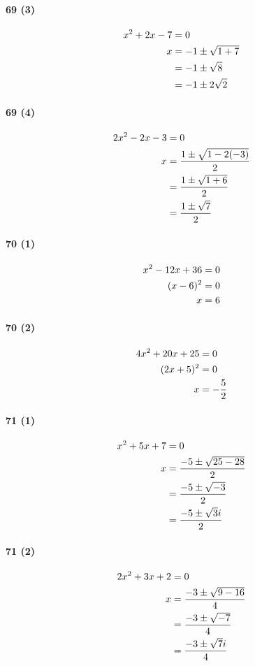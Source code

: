 \documentclass[fleqn,a4j,dvipdfmx,uplatex,twocolumn]{jsarticle}
\def\nr{\notag\\}%
\begin{document}
\paragraph{69 (3)}
\begin{align*}
  x^2 + 2x - 7 &= 0 \nr
  x &= -1 \pm \sqrt{1 + 7} \nr
  &= -1 \pm \sqrt{8} \nr
  &= -1 \pm 2\sqrt{2}
\end{align*}

\paragraph{69 (4)}
\begin{align*}
  2x^2 - 2x - 3 &= 0 \nr
  x &= \frac{1 \pm \sqrt{1 - 2(-3)}}{2} \nr
  &= \frac{1 \pm \sqrt{1 + 6}}{2} \nr
  &= \frac{1 \pm \sqrt{7}}{2}
\end{align*}

\paragraph{70 (1)}
\begin{align*}
  x^2 - 12x + 36 &= 0 \nr
  (x - 6)^2 &= 0 \nr
  x &= 6
\end{align*}

\paragraph{70 (2)}
\begin{align*}
  4x^2 + 20x + 25 &= 0 \nr
  (2x + 5)^2 &= 0 \nr
  x &= -\frac{5}{2}
\end{align*}

\paragraph{71 (1)}
\begin{align*}
  x^2 + 5x + 7 &= 0 \nr
  x &= \frac{-5 \pm \sqrt{25 - 28}}{2} \nr
  &= \frac{-5 \pm \sqrt{-3}}{2} \nr
  &= \frac{-5 \pm \sqrt{3}i}{2}
\end{align*}

\paragraph{71 (2)}
\begin{align*}
  2x^2 + 3x + 2 &= 0 \nr
  x &= \frac{-3 \pm \sqrt{9 - 16}}{4} \nr
  &= \frac{-3 \pm \sqrt{-7}}{4} \nr
  &= \frac{-3 \pm \sqrt{7}i}{4}
\end{align*}
\end{document}
